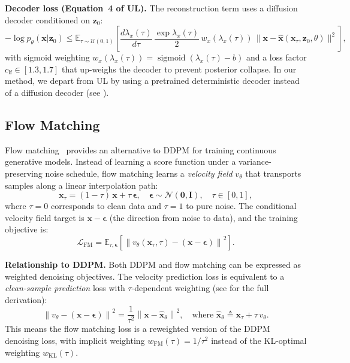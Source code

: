 \documentclass{article}
\newcommand{\vx}{\bm{x}}
\newcommand{\vz}{\bm{z}}
\newcommand{\vep}{\bm{\epsilon}}
\newcommand{\E}{\mathbb{E}}
\newcommand{\KL}{\mathrm{KL}}
\newcommand{\loss}{\mathcal{L}}
\DeclareMathOperator{\sigmoid}{sigmoid}
\begin{document}
\textbf{Decoder loss (Equation~4 of UL).}
The reconstruction term uses a diffusion decoder conditioned on $\vz_0$:
\begin{equation}
  -\log p_\theta(\vx|\vz_0) \leq \E_{\tau\sim\mathcal{U}(0,1)}\!\left[\frac{d\lambda_x(\tau)}{d\tau}\,\frac{\exp\lambda_x(\tau)}{2}\,w_x(\lambda_x(\tau))\,\|\vx - \hat{\vx}(\vx_\tau, \vz_0, \theta)\|^2\right],
  \label{eq:ul_decoder}
\end{equation}
with sigmoid weighting $w_x(\lambda_x(\tau)) = \sigmoid(\lambda_x(\tau) - b)$ and a loss factor $c_{\text{lf}} \in [1.3, 1.7]$ that up-weighs the decoder to prevent posterior collapse.
In our method, we depart from UL by using a pretrained deterministic decoder instead of a diffusion decoder (see ).

\subsection{Flow Matching}
\label{sec:flow_matching_background}

Flow matching~\citep{lipman2023flow,liu2023flow} provides an alternative to DDPM for training continuous generative models. Instead of learning a score function under a variance-preserving noise schedule, flow matching learns a \emph{velocity field} $v_\theta$ that transports samples along a linear interpolation path:
\begin{equation}
  \vx_\tau = (1-\tau)\,\vx + \tau\,\vep, \quad \vep \sim \mathcal{N}(\bm{0}, \bm{I}), \quad \tau \in [0,1],
  \label{eq:fm_interpolation}
\end{equation}
where $\tau=0$ corresponds to clean data and $\tau=1$ to pure noise. The conditional velocity field target is $\vx - \vep$ (the direction from noise to data), and the training objective is:
\begin{equation}
  \loss_{\text{FM}} = \E_{\tau, \vep}\!\left[\left\|v_\theta(\vx_\tau, \tau) - (\vx - \vep)\right\|^2\right].
  \label{eq:fm_loss}
\end{equation}

\textbf{Relationship to DDPM.}
Both DDPM and flow matching can be expressed as weighted denoising objectives. The velocity prediction loss is equivalent to a \emph{clean-sample prediction} loss with $\tau$-dependent weighting (see  for the full derivation):
\begin{equation}
  \left\|v_\theta - (\vx - \vep)\right\|^2 = \frac{1}{\tau^2}\left\|\vx - \hat{\vx}_\theta\right\|^2, \quad \text{where } \hat{\vx}_\theta \triangleq \vx_\tau + \tau\, v_\theta.
  \label{eq:fm_ddpm_equiv}
\end{equation}
This means the flow matching loss is a reweighted version of the DDPM denoising loss, with implicit weighting $w_{\text{FM}}(\tau) = 1/\tau^2$ instead of the KL-optimal weighting $w_{\KL}(\tau)$.
\end{document}
